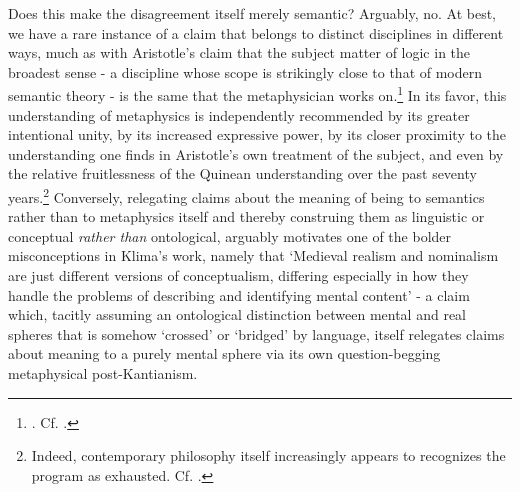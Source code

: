 \documentclass[]{article}
\begin{document}
Does this make the disagreement itself merely semantic? 
Arguably, no. 
At best, we have a rare instance of a claim that belongs to distinct disciplines in different ways, 
much as with Aristotle's claim that the subject matter of logic in the broadest sense - 
a discipline whose scope is strikingly close to that of modern semantic theory - 
is the same that the metaphysician works on.\footnote{\autocite[1004b 22-23]{Metaph}. Cf. \autocite[q. 3]{ScotusIsagoge}.}
In its favor, 
this understanding of metaphysics is independently recommended 
by its greater intentional unity, 
by its increased expressive power, 
by its closer proximity to the understanding one finds in Aristotle's own treatment of the subject, 
and even by the relative fruitlessness of the Quinean understanding over the past seventy years.\footnote{
Indeed, contemporary philosophy itself increasingly appears to recognizes the program as exhausted. Cf. \autocite{Schaffer2009,Schaffer2016}.} 
Conversely, 
relegating claims about the meaning of being to semantics 
rather than to metaphysics itself 
and thereby construing them as linguistic or conceptual \emph{rather than} ontological, 
arguably motivates one of the bolder misconceptions in Klima's work, 
namely that 
`Medieval realism and nominalism are just different versions of conceptualism, differing especially in how they handle the problems of 
describing and identifying mental content' \autocite[110]{Klima2011} 
- a claim which, 
tacitly assuming an ontological distinction between mental and real spheres that is somehow `crossed' or `bridged' by language, 
itself relegates claims about meaning to a purely mental sphere via its own question-begging metaphysical post-Kantianism.

\printbibliography
\end{document}
